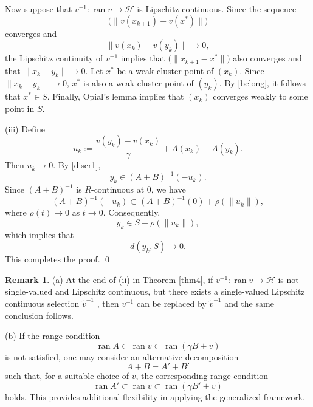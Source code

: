 \documentclass[11pt]{article}
\makeatletter
\renewenvironment{proof}[1][\proofname]{\par
	\normalfont
	\topsep0\p@\@plus3\p@ \trivlist
	\item[\hskip\labelsep\itshape
	#1\@addpunct{.}]\ignorespaces
}{%
	\qed\endtrivlist
}
\theoremstyle{definition}
\theoremstyle{definition}
\theoremstyle{definition}
\newtheorem{remark}[theorem]{Remark}
\makeatother
\begin{document}
\begin{proof}
\medskip
Now suppose that $v^{-1}:\operatorname{ran}v\to\mathcal{H}$ is Lipschitz continuous. Since the sequence
$$
\bigl(\|v(x_{k+1})-v(x^*)\|\bigr)
$$
converges and
$$
\|v(x_k)-v(y_k)\|\to0,
$$
the Lipschitz continuity of $v^{-1}$ implies that
$
\bigl(\|x_{k+1}-x^*\|\bigr)
$
also converges and that
$
\|x_k-y_k\| \to 0.
$
Let $x^*$ be a weak cluster point of $(x_k)$. Since $\|x_k-y_k\|\to0$, $x^*$ is also a weak cluster point of $(y_k)$. By \eqref{belong}, it follows that $x^*\in S$. Finally, Opial's lemma implies that $(x_k)$ converges weakly to some point in $S$.

\noindent
(iii) Define
\[
u_k:=
\frac{v(y_k)-v(x_k)}{\gamma}
+A(x_k)-A(y_k).
\]
Then $u_k\to0$. By \eqref{discr1},
\[
y_k\in(A+B)^{-1}(-u_k).
\]
Since $(A+B)^{-1}$ is $R$-continuous at $0$, we have
\[
(A+B)^{-1}(-u_k)
\subset
(A+B)^{-1}(0)+\rho(\|u_k\|),
\]
where $\rho(t)\to0$ as $t\to0$. Consequently,
\[
y_k
\in
S+\rho(\|u_k\|),
\]
which implies that
\[
d(y_k,S)\longrightarrow0.
\]
This completes the proof.
\end{proof}

\begin{remark}
	\label{rem:3.5}
	\rm(a) At the end of (ii) in Theorem \ref{thm4}, if
	$v^{-1}:\operatorname{ran}v\to \mathcal{H}$ is not single-valued and Lipschitz continuous, {but there exists a single-valued Lipschitz continuous selection $\widetilde v^{-1}$} , then $v^{-1}$ can be replaced by $\widetilde v^{-1}$ and the same conclusion follows.
	
	\rm(b) If the range condition
	\[
	\operatorname{ran} A\subset \operatorname{ran}v
	\subset \operatorname{ran}(\gamma B+v)
	\]
	is not satisfied, one may consider an alternative decomposition
	\[
	A+B=A'+B'
	\]
	such that, for a suitable choice of $v$, the corresponding range condition
	\[
	\operatorname{ran} A'\subset \operatorname{ran}v
	\subset \operatorname{ran}(\gamma B'+v)
	\]
	holds. This provides additional flexibility in applying the generalized framework.
\end{remark}
\end{document}
